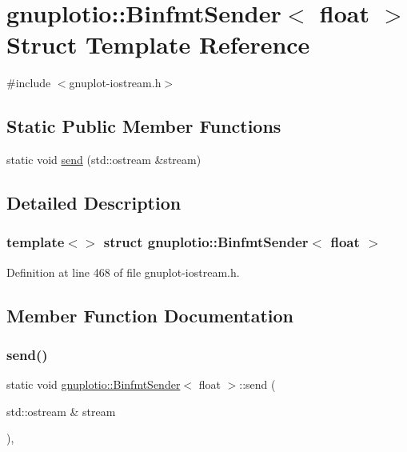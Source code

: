 \hypertarget{structgnuplotio_1_1_binfmt_sender_3_01float_01_4}{}\section{gnuplotio\+:\+:Binfmt\+Sender$<$ float $>$ Struct Template Reference}
\label{structgnuplotio_1_1_binfmt_sender_3_01float_01_4}


{\ttfamily \#include $<$gnuplot-\/iostream.\+h$>$}

\subsection*{Static Public Member Functions}
\begin{DoxyCompactItemize}
\item 
static void \hyperlink{structgnuplotio_1_1_binfmt_sender_3_01float_01_4_ae9c6a1915ee24e54ea5ed1a22c54fee1}{send} (std\+::ostream \&stream)
\end{DoxyCompactItemize}


\subsection{Detailed Description}
\subsubsection*{template$<$$>$\newline
struct gnuplotio\+::\+Binfmt\+Sender$<$ float $>$}



Definition at line 468 of file gnuplot-\/iostream.\+h.



\subsection{Member Function Documentation}
\mbox{\label{structgnuplotio_1_1_binfmt_sender_3_01float_01_4_ae9c6a1915ee24e54ea5ed1a22c54fee1}} 
\subsubsection{\texorpdfstring{send()}{send()}}
{\footnotesize\ttfamily static void \hyperlink{structgnuplotio_1_1_binfmt_sender}{gnuplotio\+::\+Binfmt\+Sender}$<$ float $>$\+::send (\begin{DoxyParamCaption}\item[{std\+::ostream \&}]{stream }\end{DoxyParamCaption})\hspace{0.3cm}{\ttfamily [inline]}, {\ttfamily [static]}}



